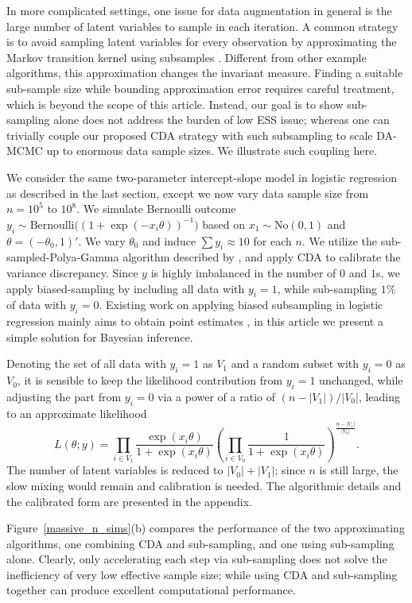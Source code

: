 \documentclass[12pt]{article}
\newcommand{\No}{\text{No}}
\newcommand{\Bern}{\text{Bernoulli}}
\begin{document}
In more complicated settings, one issue for data augmentation in general is the large number of latent variables to sample in each iteration.  A common strategy is to {avoid sampling latent variables for
every observation by approximating the Markov transition kernel using subsamples} 
\citep{quiroz2016exact,johndrow2015approximations}. {Different from other
example algorithms, this approximation changes the invariant measure. Finding
a suitable sub-sample size while bounding approximation
error requires careful treatment, which is beyond the scope of
this article. Instead, our goal is to show sub-sampling alone does not address the burden of low ESS issue; whereas }{one can trivially couple our proposed CDA
strategy with such subsampling to scale DA-MCMC up to enormous data sample sizes.  We illustrate such 
coupling here.}

We consider the same two-parameter intercept-slope model in logistic regression
as described in the last section, except we now vary data sample size from
$n=10^5$ to $10^8$. We simulate Bernoulli outcome \\$y_i\sim \Bern\big(({1+\exp(-x_i\theta)})^{-1}\big)$ based on $x_1\sim \No(0,1)$ and $\theta=(-\theta_0,1)'$. We vary $\theta_0$ and induce $\sum{y_i}\approx
10$ for each $n$. We utilize the sub-sampled-Polya-Gamma algorithm described by \cite{johndrow2015approximations},
and apply CDA to calibrate the variance discrepancy. Since $y$ is highly imbalanced in
the number of $0$ and $1$s, we apply biased-sampling by including all data
with $y_i=1$, while sub-sampling $1\%$ of data with $y_i=0$. {Existing work on applying biased subsampling in logistic regression mainly aims to obtain point estimates \citep{king2001logistic,wang2017optimal},
in this article we present a simple solution for Bayesian inference.}

{Denoting the set of all data with $y_i=1$ as $V_1$ and a random subset  with $y_i=0$ as $V_0$, it is sensible to keep
the likelihood contribution from $y_i=1$ unchanged, while adjusting the part from $y_i=0$ via a power of a ratio of $({n-|V_1|})/{|V_0|}$, leading to an approximate likelihood
$$L(\theta;y) = \prod_{i\in V_1}\frac{\exp(x_i\theta)}{ 1+\exp(x_i\theta)}  (\prod_{i\in V_0}\frac{1}{ 1+\exp(x_i\theta)}
)^{\frac{n-|V_1|}{|V_0|}}.$$
The number of latent variables is reduced to $|V_0|+|V_1|$; since
$n$ is still large, the slow mixing would remain and calibration is needed.
} The algorithmic details and the calibrated form are presented in the appendix.


Figure~\ref{massive_n_sims}(b) compares the performance of the two approximating
algorithms, one  combining CDA and sub-sampling, and one  using sub-sampling alone. Clearly, only accelerating each step via sub-sampling  does not solve the inefficiency  of very low
effective sample size; while using CDA and  sub-sampling together can produce {excellent computational performance}. 
\end{document}
